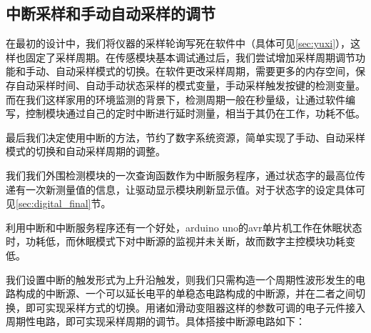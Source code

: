 \documentclass[a4paper, 11pt]{article} %
\begin{document}
\subsection{中断采样和手动自动采样的调节}
\label{sec:intr}

在最初的设计中，我们将仪器的采样轮询写死在软件中（具体可见\ref{sec:yuxi}），这样也固定了采样周期。在传感模块基本调试通过后，我们尝试增加采样周期调节功能和手动、自动采样模式的切换。在软件更改采样周期，需要更多的内存空间，保存自动采样时间、自动手动状态采样的模式变量，手动采样触发按键的检测变量。而在我们这样家用的环境监测的背景下，检测周期一般在秒量级，让通过软件编写，控制模块通过自己的定时中断进行延时测量，相当于其仍在工作，功耗不低。

最后我们决定使用中断的方法，节约了数字系统资源，简单实现了手动、自动采样模式的切换和自动采样周期的调整。

我们我们外围检测模块的一次查询函数作为中断服务程序，通过状态字的最高位传递有一次新测量值的信息，让驱动显示模块刷新显示值。对于状态字的设定具体可见\ref{sec:digital_final}节。

利用中断和中断服务程序还有一个好处，arduino uno的avr单片机工作在休眠状态时，功耗低，而休眠模式下对中断源的监视并未关断，故而数字主控模块功耗变低。

我们设置中断的触发形式为上升沿触发，则我们只需构造一个周期性波形发生的电路构成的中断源、一个可以延长电平的单稳态电路构成的中断源，并在二者之间切换，即可实现采样方式的切换。用诸如滑动变阻器这样的参数可调的电子元件接入周期性电路，即可实现采样周期的调节。具体搭接中断源电路如下：
\end{document}
